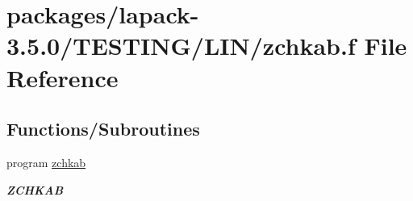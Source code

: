\hypertarget{zchkab_8f}{}\section{packages/lapack-\/3.5.0/\+T\+E\+S\+T\+I\+N\+G/\+L\+I\+N/zchkab.f File Reference}
\label{zchkab_8f}
\subsection*{Functions/\+Subroutines}
\begin{DoxyCompactItemize}
\item 
program \hyperlink{group__complex16__lin_ga9dbe809c934600057831d761bc2fa7db}{zchkab}
\begin{DoxyCompactList}\small\item\em {\bfseries Z\+C\+H\+K\+A\+B} \end{DoxyCompactList}\end{DoxyCompactItemize}
